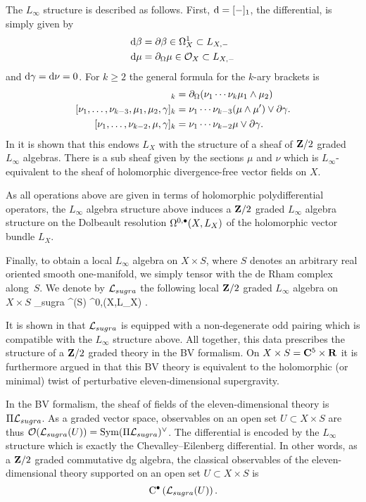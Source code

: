 \documentclass[11pt]{amsart}
\begin{document}
The $L_\infty$ structure is described as follows. 
First, ${\rm d} = [-]_1$, the differential, is simply given by 
\begin{align*}
{\rm d} \beta & = \partial \beta \in \Omega^1_X \subset L_{X,-} \\
{\rm d} \mu & = \partial_{\Omega} \mu \in \mathcal O_X \subset L_{X, -}
\end{align*}
and ${\rm d} \gamma = {\rm d} \nu = 0$. 
For $k \geq 2$ the general formula for the $k$-ary brackets is 
\begin{align*}
[\nu_1, \ldots, \nu_{k-2}, \mu_1,\mu_2]_{k} & = \div(\nu_1 \cdots \nu_k \mu_1 \wedge \mu_2) \\
[\nu_1,\ldots, \nu_{k-3}, \mu_1,\mu_2,\gamma]_k & = \nu_1 \cdots \nu_{k-3} (\mu \wedge \mu') \vee \del \gamma .\\
[\nu_1,\ldots,\nu_{k-2}, \mu, \gamma]_k & = \nu_1 \cdots \nu_{k-2} \mu \vee \del \gamma .
\end{align*}
In \cite{RSW} it is shown that this endows $L_{X}$ with the structure of a sheaf of $\mathbf{Z}/2$ graded $L_\infty$ algebras.
There is a sub sheaf given by the sections $\mu$ and $\nu$ which is $L_\infty$-equivalent to the sheaf of holomorphic divergence-free vector fields on $X$. 

As all operations above are given in terms of holomorphic polydifferential operators, the $L_\infty$ algebra structure above induces a $\mathbf{Z}/2$ graded $L_\infty$ algebra structure on the Dolbeault resolution $\Omega^{0,\bullet}(X,L_X)$ of the holomorphic vector bundle $L_X$.

Finally, to obtain a local $L_\infty$ algebra on $X \times S$, where $S$ denotes an arbitrary real oriented smooth one-manifold, we simply tensor with the de Rham complex along~$S$.
We denote by $\mathcal L_{sugra}$ the following local $\mathbf{Z}/2$ graded $L_\infty$ algebra on $X \times S$
\beqn
\cL_{sugra}  \Omega^\bu(S) \hotimes \Omega^{0,\bu}(X,L_X) .
\eeqn

\parsec[s:rsw]
It is shown in \cite{RSW} that $\mathcal L_{sugra}$ is equipped with a non-degenerate odd pairing which is compatible with the $L_\infty$ structure above. 
All together, this data prescribes the structure of a $\mathbf{Z}/2$ graded theory in the BV formalism. 
On $X \times S = \mathbf{C}^5 \times \mathbf{R}$ it is furthermore argued in \cite{RSW} that this BV theory is equivalent to the holomorphic (or minimal) twist of perturbative eleven-dimensional supergravity. 

\parsec[s:sugraobs]

In the BV formalism, the sheaf of fields of the eleven-dimensional theory is $\Pi \mathcal L_{sugra}$. 
As a graded vector space, observables on an open set $U \subset X \times S$ are thus $\mathcal O(\mathcal L_{sugra}(U)) = \operatorname{Sym} (\Pi \mathcal L_{sugra})^\vee$.
The differential is encoded by the $L_\infty$ structure which is exactly the Chevalley--Eilenberg differential. 
In other words, as a $\mathbf{Z}/2$ graded commutative dg algebra, the classical observables of the eleven-dimensional theory supported on an open set $U \subset X \times S$ is 
\[
{\rm C}^\bullet\left(\mathcal L_{sugra}(U)\right) .
\]
\end{document}
